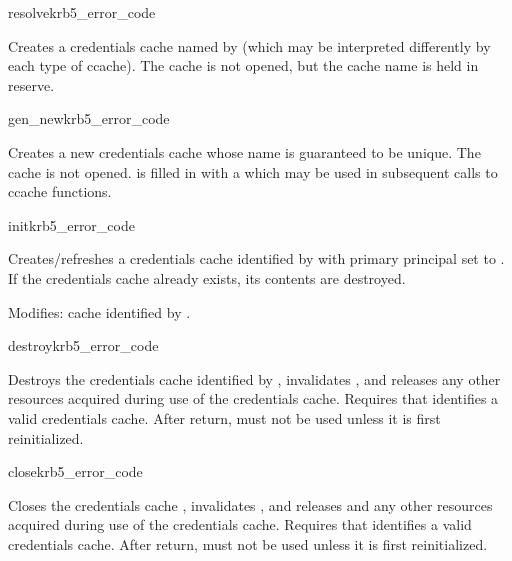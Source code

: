 \begin{funcdecl}{resolve}{krb5_error_code}{\funcout}
\funcin
{}
\end{funcdecl}

Creates a credentials cache named by  (which may be
interpreted differently by each type of ccache).  The cache is not
opened, but the cache name is held in reserve.

\begin{funcdecl}{gen_new}{krb5_error_code}{\funcout}
\end{funcdecl}

Creates a new credentials cache whose name is guaranteed to be
unique.  The cache is not opened.  is
filled in with a  which may be used in subsequent
calls to ccache functions.

\begin{funcdecl}{init}{krb5_error_code}{\funcinout}
\funcin
{}
\end{funcdecl}

Creates/refreshes a credentials cache identified by  with
primary principal set to .
If the credentials cache already exists, its contents are destroyed.


Modifies: cache identified by .

\begin{funcdecl}{destroy}{krb5_error_code}{\funcin}
\end{funcdecl}

Destroys the credentials cache identified by , invalidates
, and releases any other resources acquired during use of
the credentials cache.  Requires that  identifies a valid
credentials cache.  After return,  must not be used unless
it is first reinitialized.


\begin{funcdecl}{close}{krb5_error_code}{\funcinout}
\end{funcdecl}

Closes the credentials cache , invalidates
, and releases  and any other resources
acquired during use of the credentials cache.  Requires that
 identifies a valid credentials cache.  After return,
 must not be used unless it is first reinitialized.


